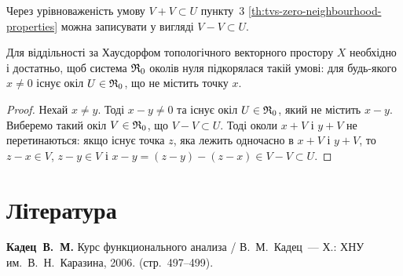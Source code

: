 \begin{remark}
    Через урівноваженість умову $V + V \subset U$ пункту~3 \cref{th:tvs-zero-neighbourhood-properties} можна записувати у вигляді $V - V \subset U$.
\end{remark}

\begin{theorem}
    Для віддільності за Хаусдорфом топологічного векторного простору $X$ необхідно і достатньо, щоб система $\frak R_0$ околів нуля підкорялася такій умові: для будь-якого $x \ne 0$ існує окіл $U \in \frak R_0$, що не містить точку $x$.
\end{theorem}

\begin{proof}
    Нехай $x \ne y$. Тоді $x - y \ne 0$ та існує окіл $U \in \frak R_0$, який не містить $x - y$. Виберемо такий окіл $V \in \frak R_0$, що $V - V \subset U$. Тоді околи $x + V$ і $y + V$ не перетинаються: якщо існує точка $z$, яка лежить одночасно в $x + V$ і $y + V$, то $z - x \in V$, $z - y \in V$ і $x - y =(z - y) -(z - x) \in V - V \subset U$.
\end{proof}

\section{Література}

\begin{enumerate}[label={[\arabic*]}]
\item \textbf{Кадец~В.~М.}
Курс функционального анализа /
В.~М.~Кадец~---
Х.: ХНУ им.~В.~Н.~Каразина, 2006. (стр.~497--499).
\end{enumerate}

